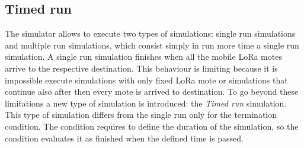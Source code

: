 \subsection{Timed run}
The simulator allows to execute two types of simulations: single run simulations and multiple run simulations, which consist simply in run more time a single run simulation. 
A single run simulation finishes when all the mobile LoRa motes arrive to the respective destination. 
This behaviour is limiting because it is impossible execute simulations with only fixed LoRa mote or simulations that continue also after then every mote is arrived to destination. 
To go beyond these limitations a new type of simulation is introduced: the \textit{Timed run} simulation. 
This type of simulation differs from the single run only for the termination condition. 
The condition requires to define the duration of the simulation, so the condition evaluates it as finished when the defined time is passed.

